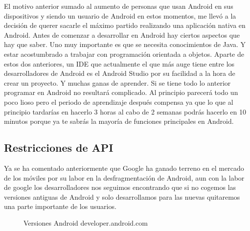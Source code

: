 El motivo anterior sumado al aumento de personas que usan Android en sus dispositivos y siendo un usuario de Android en estos momentos, me llevó a la decisión de querer sacarle el máximo partido realizando una aplicación nativa en Android.
Antes de comenzar a desarrollar en Android hay ciertos aspectos que hay que saber.
Uno muy importante es que se necesita conocimientos de Java.
Y estar acostumbrado a trabajar con programación orientada a objetos.
Aparte de estos dos anteriores, un IDE que actualmente el que más auge tiene entre los desarrolladores de Android es el Android Studio por su facilidad a la hora de crear un proyecto.
Y muchas ganas de aprender.
Si se tiene todo lo anterior programar en Android no resultará complicado. Al principio parecerá todo un poco lioso pero el periodo de aprendizaje después compensa ya que lo que al principio tardarías en hacerlo 3 horas al cabo de 2 semanas podrás hacerlo en 10 minutos porque ya te sabrás la mayoría de funciones principales en Android.


\subsection{Restricciones de API}
\label{subsecc:Restricciones de API}

Ya se ha comentado anteriormente que Google ha ganado terreno en el mercado de los móviles por su labor en la desfragmentación de Android, aun con la labor de google los desarrolladores nos seguimos encontrando que si no cogemos las versiones antiguas de Android y solo desarrollamos para las nuevas quitaremos una parte importante de los usuarios.

\begin{figure}[H] 
  \begin{center} 
    \caption{Versiones Android developer.android.com} 
    \label{fig:VersionesAndroid2} 
  \end{center} 
\end{figure}

